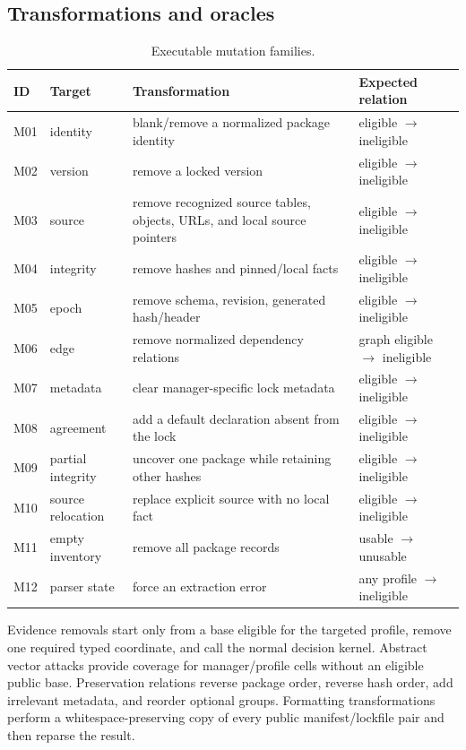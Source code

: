 \documentclass[10pt,conference]{IEEEtran}
\begin{document}
\subsection{Transformations and oracles}
\begin{table}[t]
\caption{Executable mutation families.}
\centering\small
\begin{tabularx}{\textwidth}{p{}p{}X X}
\toprule
ID & Target & Transformation & Expected relation\\
\midrule
M01 & identity & blank/remove a normalized package identity & eligible $\rightarrow$ ineligible\\
M02 & version & remove a locked version & eligible $\rightarrow$ ineligible\\
M03 & source & remove recognized source tables, objects, URLs, and local source pointers & eligible $\rightarrow$ ineligible\\
M04 & integrity & remove hashes and pinned/local facts & eligible $\rightarrow$ ineligible\\
M05 & epoch & remove schema, revision, generated hash/header & eligible $\rightarrow$ ineligible\\
M06 & edge & remove normalized dependency relations & graph eligible $\rightarrow$ ineligible\\
M07 & metadata & clear manager-specific lock metadata & eligible $\rightarrow$ ineligible\\
M08 & agreement & add a default declaration absent from the lock & eligible $\rightarrow$ ineligible\\
M09 & partial integrity & uncover one package while retaining other hashes & eligible $\rightarrow$ ineligible\\
M10 & source relocation & replace explicit source with no local fact & eligible $\rightarrow$ ineligible\\
M11 & empty inventory & remove all package records & usable $\rightarrow$ unusable\\
M12 & parser state & force an extraction error & any profile $\rightarrow$ ineligible\\
\bottomrule
\end{tabularx}
\end{table}

Evidence removals start only from a base eligible for the targeted profile, remove one required typed coordinate, and call the normal decision kernel. Abstract vector attacks provide coverage for manager/profile cells without an eligible public base. Preservation relations reverse package order, reverse hash order, add irrelevant metadata, and reorder optional groups. Formatting transformations perform a whitespace-preserving copy of every public manifest/lockfile pair and then reparse the result.
\end{document}
